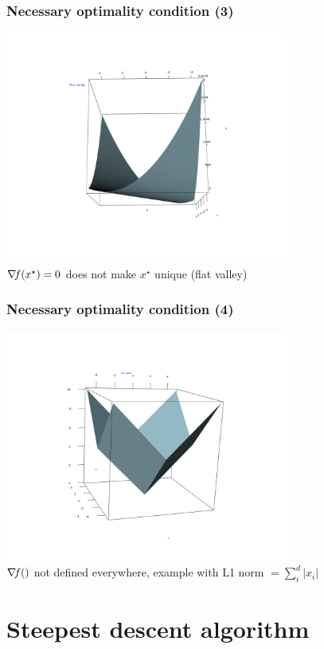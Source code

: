 \documentclass[12pt]{beamer}
\begin{document}
\begin{frame}
\frametitle{Necessary optimality condition (3)} 
\begin{center}
\includegraphics[width=0.7\textwidth]{flat_valley.png} \\
$\nabla\!{f}(x^\star) = 0$ does not make $x^\star$ unique (flat valley)
\end{center}
\end{frame}

\begin{frame}
\frametitle{Necessary optimality condition (4)} 
\begin{center}
\includegraphics[width=0.7\textwidth]{L1norm.png} \\
$\nabla\!{f}()$ not defined everywhere, example with L1 norm $= \sum_i^d \lvert x_i \rvert$
\end{center}
\end{frame}

\section{Steepest descent algorithm}
\end{document}
